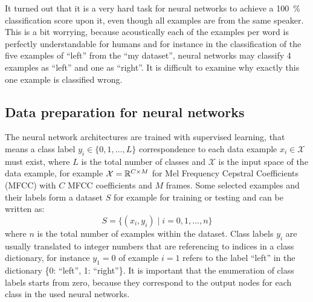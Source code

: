 \FloatBarrier
\noindent
It turned out that it is a very hard task for neural networks to achieve a \SI{100}{\percent} classification score upon it, even though all examples are from the same speaker.
This is a bit worrying, because acoustically each of the examples per word is perfectly understandable for humans and for instance in the classification of the five examples of \enquote{left} from the \enquote{my dataset}, neural networks may classify 4 examples as \enquote{left} and one as \enquote{right}.
It is difficult to examine why exactly this one example is classified wrong.



\subsection{Data preparation for neural networks}\label{sec:exp_data_prep}
The neural network architectures are trained with supervised learning, that means a class label $y_i \in \{0, 1, \dots, L\}$ correspondence to each data example $x_i \in \mathcal{X}$ must exist, where $L$ is the total number of classes and $\mathcal{X}$ is the input space of the data example, for example $\mathcal{X} = \mathbb{R}^{C \times M}$ for Mel Frequency Cepstral Coefficients (MFCC) with $C$ MFCC coefficients and $M$ frames.
Some selected examples and their labels form a dataset $S$ for example for training or testing and can be written as:
\begin{equation}\label{eq:exp_dataset}
  S = \{ (x_i, y_i) \mid i = 0, 1, \dots, n \}
\end{equation}
where $n$ is the total number of examples within the dataset.
Class labels $y_i$ are usually translated to integer numbers that are referencing to indices in a class dictionary, for instance $y_1 = 0$ of example $i=1$ refers to the label \enquote{left} in the dictionary \{0: \enquote{left}, 1: \enquote{right}\}.
It is important that the enumeration of class labels starts from zero, because they correspond to the output nodes for each class in the used neural networks.

